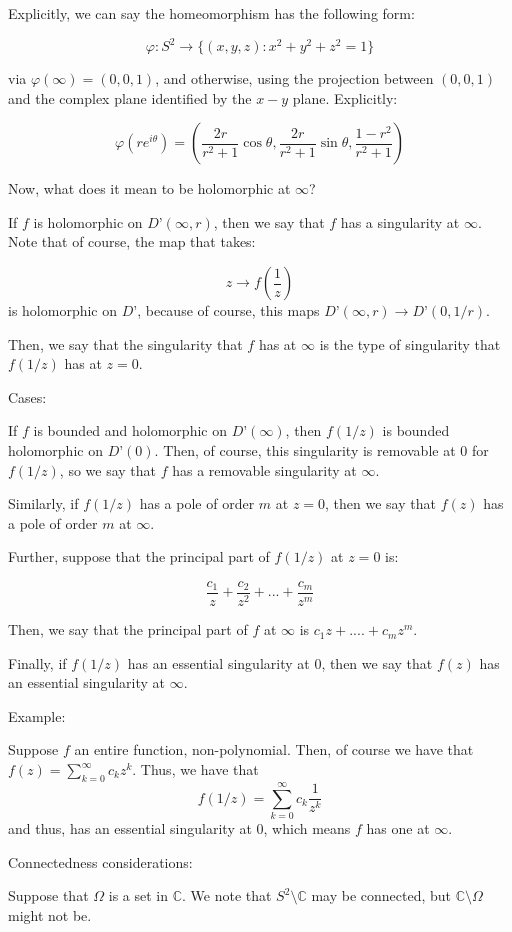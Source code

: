 \documentclass[10pt]{article}
\begin{document}
Explicitly, we can say the homeomorphism has the following form:

$$\varphi: S^2 \to \{ (x,y,z) : x^2 + y^2 + z^2 = 1\}$$

via $\varphi(\infty)  = (0,0,1)$, and otherwise, using the projection between $(0,0,1)$ and the complex plane identified by the $x-y$ plane. Explicitly:

$$\varphi(r e^{i\theta}) =\left(\frac{2r}{r^2 + 1} \cos \theta,\frac{2r}{r^2 + 1} \sin \theta, \frac{1-r^2}{r^2 + 1}\right)$$

Now, what does it mean to be holomorphic at $\infty$?

If $f$ is holomorphic on $D’(\infty, r)$, then we say that $f$ has a singularity at $\infty$. Note that of course, the map that takes:

$$ z \to f\left(\frac{1}{z}\right)$$ is holomorphic on $D’$, because of course, this maps $D’(\infty,r) \to D’(0,1/r)$.

Then, we say that the singularity that $f$ has at $\infty$ is the type of singularity that $f(1/z)$ has at $z = 0$. 

Cases:

If $f$ is bounded and holomorphic on $D’(\infty)$, then $f(1/z)$ is bounded holomorphic on $D’(0)$. Then, of course, this singularity is removable at 0 for $f(1/z)$, so we say that $f$ has a removable singularity at $\infty$.

Similarly, if $f(1/z)$ has a pole of order $m$ at $z=0$, then we say that $f(z)$ has a pole of order $m$ at $\infty$. 

Further, suppose that the principal part of $f(1/z)$ at $z = 0$ is:

$$ \frac{c_1}{z} + \frac{c_2}{z^2}  + ... + \frac{c_m}{z^m} $$

Then, we say that the principal part of $f$ at $\infty$ is $c_1 z + .... + c_m z^m$.

Finally, if $f(1/z)$ has an essential singularity at $0$, then we say that $f(z)$ has an essential singularity at $\infty$. 

Example:

Suppose $f$ an entire function, non-polynomial. Then, of course we have that $f(z) = \sum_{k=0}^\infty c_k z^k$. Thus, we have that $$f(1/z) = \sum_{k=0}^\infty c_k \frac{1}{z^k}$$ and thus, has an essential singularity at $0$, which means $f$ has one at $\infty$. 

Connectedness considerations:

Suppose that $\Omega$ is a set in $\mathbb{C}$. We note that $S^{2}  \setminus \mathbb{C}$ may be connected, but $\mathbb{C} \setminus \Omega$ might not be.
\end{document}
